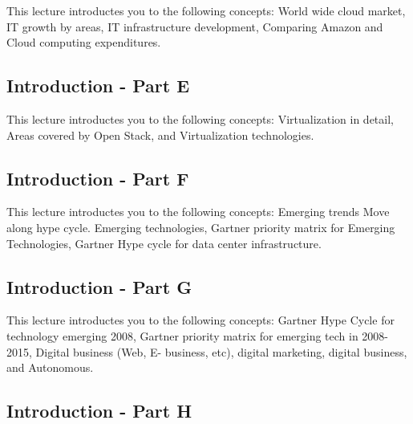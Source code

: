 This lecture introductes you to the following concepts: World wide
cloud market, IT growth by areas, IT infrastructure development,
Comparing Amazon and Cloud computing expenditures.

\subsection{Introduction - Part E}\label{s:cloud-fundamentals-e}

This lecture introductes you to the following concepts: Virtualization
in detail, Areas covered by Open Stack, and Virtualization technologies.

\subsection{Introduction - Part F}\label{s:cloud-fundamentals-f}

This lecture introductes you to the following concepts: Emerging
trends Move along hype cycle. Emerging technologies, Gartner priority
matrix for Emerging Technologies, Gartner Hype cycle for data center
infrastructure.

\subsection{Introduction - Part G}\label{s:cloud-fundamentals-g}

This lecture introductes you to the following concepts: Gartner Hype
Cycle for technology emerging 2008, Gartner priority matrix for
emerging tech in 2008-2015, Digital business (Web, E- business, etc),
digital marketing, digital business, and Autonomous.

\subsection{Introduction - Part H}\label{s:cloud-fundamentals-h}

